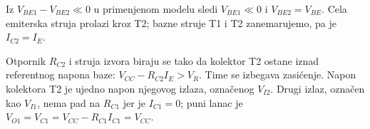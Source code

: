 Iz $V_{BE1}-V_{BE2}\ll0$ u primenjenom modelu sledi $V_{BE1}\ll0$ i $V_{BE2}=V_{BE}$. Cela emiterska struja prolazi kroz T2; bazne struje T1 i T2 zanemarujemo, pa je $I_{C2}=I_E$.

Otpornik $R_{C2}$ i struja izvora biraju se tako da kolektor T2 ostane iznad referentnog napona baze: $V_{CC}-R_{C2}I_E>V_R$. Time se izbegava zasićenje. Napon kolektora T2 je ujedno napon njegovog izlaza, označenog $V_{I2}$. Drugi izlaz, označen kao $V_{I1}$, nema pad na $R_{C1}$ jer je $I_{C1}=0$; puni lanac je $V_{O1}=V_{C1}=V_{CC}-R_{C1}I_{C1}=V_{CC}$.
